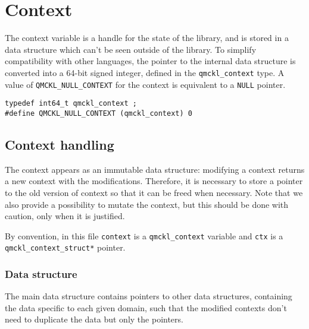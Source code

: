 \section*{Context}

The context variable is a handle for the state of the library,
and is stored in a data structure which can't be seen outside of
the library.  To simplify compatibility with other languages, the
pointer to the internal data structure is converted into a 64-bit
signed integer, defined in the \texttt{qmckl\_context} type.
A value of \texttt{QMCKL\_NULL\_CONTEXT} for the context is equivalent to a
\texttt{NULL} pointer.

\begin{verbatim}
typedef int64_t qmckl_context ;
#define QMCKL_NULL_CONTEXT (qmckl_context) 0
\end{verbatim}

\subsection{Context handling}
\label{sec:org502090e}

The context appears as an immutable data structure: modifying a
context returns a new context with the modifications.  Therefore, it
is necessary to store a pointer to the old version of context so
that it can be freed when necessary.
Note that we also provide a possibility to mutate the context, but
this should be done with caution, only when it is justified.

By convention, in this file \texttt{context} is a \texttt{qmckl\_context} variable
and \texttt{ctx} is a \texttt{qmckl\_context\_struct*} pointer.

\subsubsection{Data structure}
\label{sec:orgca6cd07}

The main data structure contains pointers to other data structures,
containing the data specific to each given domain, such that the
modified contexts don't need to duplicate the data but only the
pointers.

